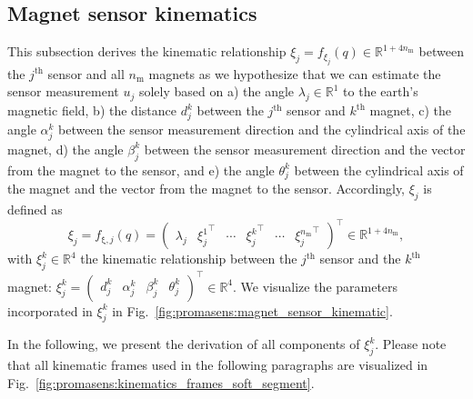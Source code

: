 \subsection{Magnet sensor kinematics}\label{sub:promasens:kinematic_model_magnet_sensor_kinematics}
This subsection derives the kinematic relationship $\xi_j = f_{\xi_j}(q) \in \mathbb{R}^{1+4n_\mathrm{m}}$ between the $j^\mathrm{th}$ sensor and all $n_\mathrm{m}$ magnets as we hypothesize that we can estimate the sensor measurement $u_j$ solely based on
a) the angle $\lambda_j \in \mathbb{R}^1$ to the earth's magnetic field,
b) the distance $d_j^k$  between the $j^\mathrm{th}$ sensor and $k^\mathrm{th}$ magnet,
c) the angle $\alpha_j^k$ between the sensor measurement direction and the cylindrical axis of the magnet,
d) the angle $\beta_j^k$ between the sensor measurement direction and the vector from the magnet to the sensor,
and e) the angle $\theta_j^k$ between the cylindrical axis of the magnet and the vector from the magnet to the sensor.
Accordingly, $\xi_j$ is defined as
\begin{equation}
    \xi_{j} = f_{\mathrm{\xi},j}(q) =
    \begin{pmatrix}
        \lambda_{j} & {\xi_{j}^1}^\top & \cdots & {\xi_{j}^k}^\top & \cdots & {\xi_{j}^{n_\mathrm{m}}}^\top
    \end{pmatrix}^\top \in \mathbb{R}^{1 + 4n_\mathrm{m}},
\end{equation}
with $\xi_j^{k} \in \mathbb{R}^4$ the kinematic relationship between the $j^\mathrm{th}$ sensor and the $k^\mathrm{th}$ magnet: $\xi_j^{k} = \begin{pmatrix} d_j^k & \alpha_j^k & \beta_j^k & \theta_j^k \end{pmatrix}^\top \in \mathbb{R}^4$. We visualize the parameters incorporated in $\xi_j^{k}$ in Fig.~\ref{fig:promasens:magnet_sensor_kinematic}.

In the following, we present the derivation of all components of $\xi_j^{k}$. 
Please note that all kinematic frames used in the following paragraphs are visualized in Fig.~\ref{fig:promasens:kinematics_frames_soft_segment}.

